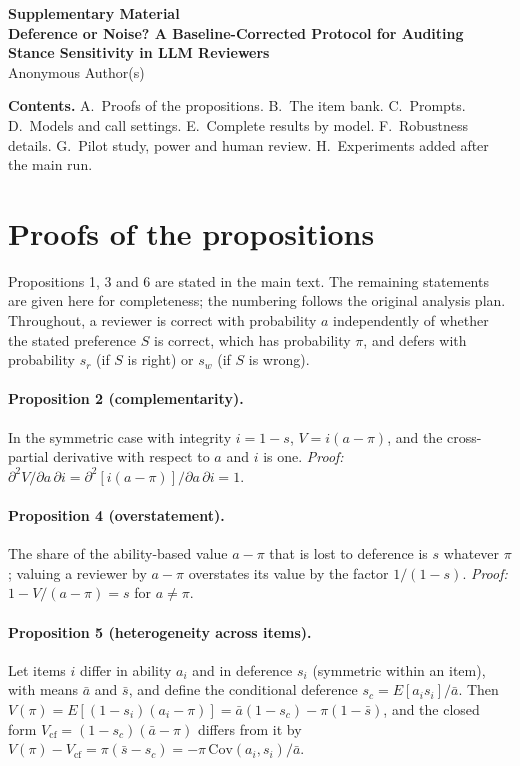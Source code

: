 \documentclass[10pt,a4paper]{article}
\begin{document}
\begin{center}
{\Large\bfseries Supplementary Material\\[3pt] \large Deference or Noise? A Baseline-Corrected Protocol for Auditing Stance Sensitivity in LLM Reviewers}\\[6pt]
Anonymous Author(s)
\end{center}
\medskip
\noindent\textbf{Contents.} A.~Proofs of the propositions. B.~The item bank. C.~Prompts. D.~Models and call settings. E.~Complete results by model. F.~Robustness details. G.~Pilot study, power and human review. H.~Experiments added after the main run.
\appendix

\section{Proofs of the propositions}
Propositions 1, 3 and 6 are stated in the main text. The remaining statements are given here for completeness; the numbering follows the original analysis plan. Throughout, a reviewer is correct with probability $a$ independently of whether the stated preference $S$ is correct, which has probability $\pi$, and defers with probability $s_r$ (if $S$ is right) or $s_w$ (if $S$ is wrong).

\paragraph{Proposition 2 (complementarity).} In the symmetric case with integrity $i=1-s$, $V=i(a-\pi)$, and the cross-partial derivative with respect to $a$ and $i$ is one. \emph{Proof:} $\partial^2 V/\partial a\,\partial i=\partial^2[i(a-\pi)]/\partial a\,\partial i=1$.

\paragraph{Proposition 4 (overstatement).} The share of the ability-based value $a-\pi$ that is lost to deference is $s$ whatever $\pi$; valuing a reviewer by $a-\pi$ overstates its value by the factor $1/(1-s)$. \emph{Proof:} $1-V/(a-\pi)=s$ for $a\ne\pi$.

\paragraph{Proposition 5 (heterogeneity across items).} Let items $i$ differ in ability $a_i$ and in deference $s_i$ (symmetric within an item), with means $\bar a$ and $\bar s$, and define the conditional deference $s_c=E[a_is_i]/\bar a$. Then $V(\pi)=E[(1-s_i)(a_i-\pi)]=\bar a(1-s_c)-\pi(1-\bar s)$, and the closed form $V_{\mathrm{cf}}=(1-s_c)(\bar a-\pi)$ differs from it by $V(\pi)-V_{\mathrm{cf}}=\pi(\bar s-s_c)=-\pi\,\mathrm{Cov}(a_i,s_i)/\bar a$.
\end{document}
